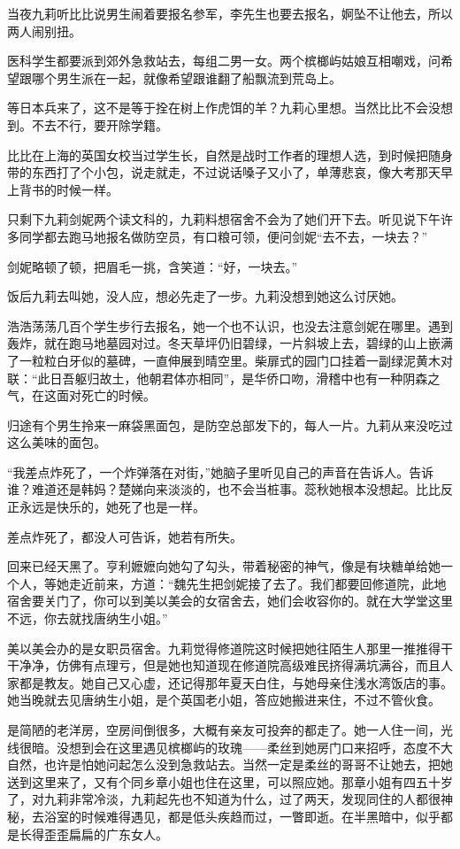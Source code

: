 \par 当夜九莉听比比说男生闹着要报名参军，李先生也要去报名，婀坠不让他去，所以两人闹别扭。
\par 医科学生都要派到郊外急救站去，每组二男一女。两个槟榔屿姑娘互相嘲戏，问希望跟哪个男生派在一起，就像希望跟谁翻了船飘流到荒岛上。
\par 等日本兵来了，这不是等于拴在树上作虎饵的羊？九莉心里想。当然比比不会没想到。不去不行，要开除学籍。
\par 比比在上海的英国女校当过学生长，自然是战时工作者的理想人选，到时候把随身带的东西打了个小包，说走就走，不过说话嗓子又小了，单薄悲哀，像大考那天早上背书的时候一样。
\par 只剩下九莉剑妮两个读文科的，九莉料想宿舍不会为了她们开下去。听见说下午许多同学都去跑马地报名做防空员，有口粮可领，便问剑妮“去不去，一块去？”
\par 剑妮略顿了顿，把眉毛一挑，含笑道：“好，一块去。”
\par 饭后九莉去叫她，没人应，想必先走了一步。九莉没想到她这么讨厌她。
\par 浩浩荡荡几百个学生步行去报名，她一个也不认识，也没去注意剑妮在哪里。遇到轰炸，就在跑马地墓园对过。冬天草坪仍旧碧绿，一片斜坡上去，碧绿的山上嵌满了一粒粒白牙似的墓碑，一直伸展到晴空里。柴扉式的园门口挂着一副绿泥黄木对联：“此日吾躯归故土，他朝君体亦相同”，是华侨口吻，滑稽中也有一种阴森之气，在这面对死亡的时候。
\par 归途有个男生拎来一麻袋黑面包，是防空总部发下的，每人一片。九莉从来没吃过这么美味的面包。
\par “我差点炸死了，一个炸弹落在对街，”她脑子里听见自己的声音在告诉人。告诉谁？难道还是韩妈？楚娣向来淡淡的，也不会当桩事。蕊秋她根本没想起。比比反正永远是快乐的，她死了也是一样。
\par 差点炸死了，都没人可告诉，她若有所失。
\par 回来已经天黑了。亨利嬷嬷向她勾了勾头，带着秘密的神气，像是有块糖单给她一个人，等她走近前来，方道：“魏先生把剑妮接了去了。我们都要回修道院，此地宿舍要关门了，你可以到美以美会的女宿舍去，她们会收容你的。就在大学堂这里不远，你去就找唐纳生小姐。”
\par 美以美会办的是女职员宿舍。九莉觉得修道院这时候把她往陌生人那里一推推得干干净净，仿佛有点理亏，但是她也知道现在修道院高级难民挤得满坑满谷，而且人家都是教友。她自己又心虚，还记得那年夏天白住，与她母亲住浅水湾饭店的事。她当晚就去见唐纳生小姐，是个英国老小姐，答应她搬进来住，不过不管伙食。
\par 是简陋的老洋房，空房间倒很多，大概有亲友可投奔的都走了。她一人住一间，光线很暗。没想到会在这里遇见槟榔屿的玫瑰——柔丝到她房门口来招呼，态度不大自然，也许是怕她问起怎么没到急救站去。当然一定是柔丝的哥哥不让她去，把她送到这里来了，又有个同乡章小姐也住在这里，可以照应她。那章小姐有四五十岁了，对九莉非常冷淡，九莉起先也不知道为什么，过了两天，发现同住的人都很神秘，去浴室的时候难得遇见，都是低头疾趋而过，一瞥即逝。在半黑暗中，似乎都是长得歪歪扁扁的广东女人。
